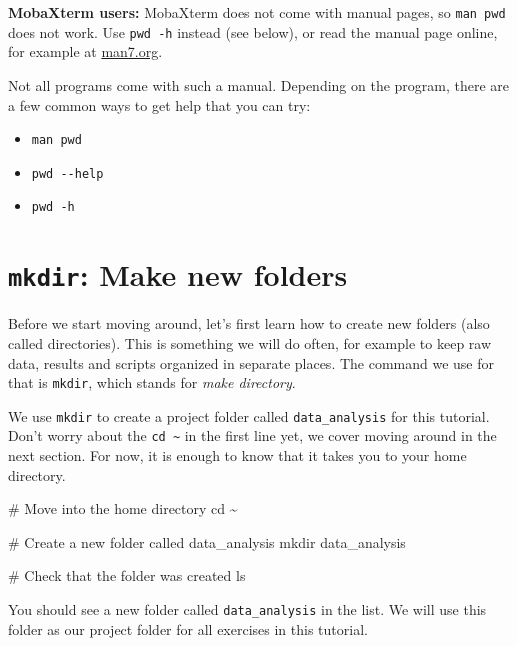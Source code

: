 \documentclass[
  letterpaper,
  DIV=11,
  numbers=noendperiod]{scrreprt}
\newenvironment{Shaded}{}{}
\newcommand{\BuiltInTok}[1]{\textcolor[rgb]{0.84,0.23,0.29}{#1}}
\newcommand{\CommentTok}[1]{\textcolor[rgb]{0.42,0.45,0.49}{#1}}
\newcommand{\FunctionTok}[1]{\textcolor[rgb]{0.44,0.26,0.76}{#1}}
\newcommand{\NormalTok}[1]{\textcolor[rgb]{0.14,0.16,0.18}{#1}}
\providecommand{\tightlist}{%
  \setlength{\itemsep}{0pt}\setlength{\parskip}{0pt}}
\begin{document}
\textbf{MobaXterm users:} MobaXterm does not come with manual pages, so
\texttt{man\ pwd} does not work. Use \texttt{pwd\ -h} instead (see
below), or read the manual page online, for example at
\href{https://man7.org/linux/man-pages/man1/pwd.1.html}{man7.org}.

Not all programs come with such a manual. Depending on the program,
there are a few common ways to get help that you can try:

\begin{itemize}
\tightlist
\item
  \texttt{man\ pwd}
\item
  \texttt{pwd\ -\/-help}
\item
  \texttt{pwd\ -h}
\end{itemize}

\section{\texorpdfstring{\texttt{mkdir}: Make new
folders}{mkdir: Make new folders}}\label{mkdir-make-new-folders}

Before we start moving around, let's first learn how to create new
folders (also called directories). This is something we will do often,
for example to keep raw data, results and scripts organized in separate
places. The command we use for that is \texttt{mkdir}, which stands for
\emph{make directory}.

We use \texttt{mkdir} to create a project folder called
\texttt{data\_analysis} for this tutorial. Don't worry about the
\texttt{cd\ \textasciitilde{}} in the first line yet, we cover moving
around in the next section. For now, it is enough to know that it takes
you to your home directory.

\begin{Shaded}
\begin{Highlighting}[]
\CommentTok{\# Move into the home directory}
\BuiltInTok{cd}\NormalTok{ \textasciitilde{}}

\CommentTok{\# Create a new folder called data\_analysis}
\FunctionTok{mkdir}\NormalTok{ data\_analysis}

\CommentTok{\# Check that the folder was created}
\FunctionTok{ls}
\end{Highlighting}
\end{Shaded}

You should see a new folder called \texttt{data\_analysis} in the list.
We will use this folder as our project folder for all exercises in this
tutorial.
\end{document}
